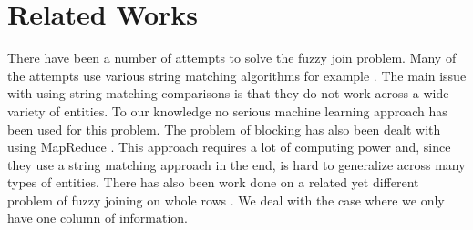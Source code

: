 \section{Related Works}
There have been a number of attempts to solve the fuzzy join problem. Many of the attempts use various string matching algorithms for example \cite{Wang:String}. The main issue with using string matching comparisons is that they do not work across a wide variety of entities. To our knowledge no serious machine learning approach has been used for this problem. The problem of blocking has also been dealt with using MapReduce \cite{Vernica:MapReduce}. This approach requires a lot of computing power and, since they use a string matching approach in the end, is hard to generalize across many types of entities. There has also been work done on a related yet different problem of fuzzy joining on whole rows \cite{he_ganjam_chu_2015}. We deal with the case where we only have one column of information.